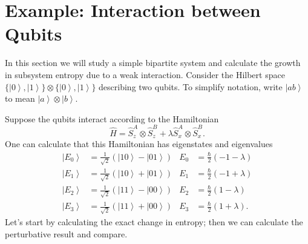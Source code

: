 \documentclass[11pt]{article}
\newcommand{\ket}[1]{\left|#1\right\rangle}
\newcommand{\op}[1]{\hat{#1}}
\theoremstyle{theorem}
\theoremstyle{remark}
\theoremstyle{step}
\theoremstyle{gap}
\begin{document}
\section{Example: Interaction between Qubits}

In this section we will study a simple bipartite system and calculate the growth in subsystem entropy due to a weak interaction. Consider the Hilbert space \(\{\ket{0}, \ket{1}\}\otimes\{\ket{0}, \ket{1}\}\) describing two qubits. To simplify notation, write \(\ket{ab}\) to mean \(\ket{a}\otimes\ket{b}\).

Suppose the qubits interact according to the Hamiltonian
\[
\op{H} = \op{S}_z^{A}\otimes\op{S}_z^B + \lambda \op{S}_x^A \otimes \op{S}_x^B.
\]
One can calculate that this Hamiltonian has eigenstates and eigenvalues
\begin{align*}
\ket{E_0} &= \frac{1}{\sqrt{2}} \left(\ket{10}-\ket{01}\right) &
E_0 &= \frac{\hbar}{2} \left(-1-\lambda\right) \\
\ket{E_1} &= \frac{1}{\sqrt{2}} \left(\ket{10}+\ket{01}\right) &
E_1 &= \frac{\hbar}{2} \left(-1+\lambda\right) \\
\ket{E_2} &= \frac{1}{\sqrt{2}} \left(\ket{11}-\ket{00}\right) &
E_2 &= \frac{\hbar}{2} \left(1-\lambda\right) \\
\ket{E_3} &= \frac{1}{\sqrt{2}} \left(\ket{11}+\ket{00}\right) &
E_3 &= \frac{\hbar}{2} \left(1+\lambda\right).
\end{align*}
Let's start by calculating the exact change in entropy; then we can calculate the perturbative result and compare.
\end{document}
